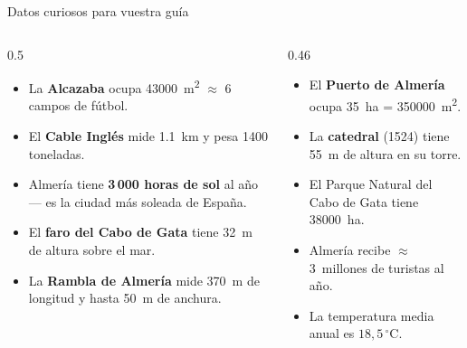 \documentclass[aspectratio=169, 10pt, spanish]{beamer}
\begin{document}
\begin{frame}{Datos curiosos para vuestra guía}
  \begin{columns}[T]
    \begin{column}{0.5\textwidth}
      \begin{notabox}
        \begin{itemize}
          \item La \textbf{Alcazaba} ocupa \SI{43000}{m^2}
                $\approx$ 6 campos de fútbol.
          \item El \textbf{Cable Inglés} mide \SI{1.1}{km}
                y pesa \num{1400} toneladas.
          \item Almería tiene \textbf{3\,000 horas de sol}
                al año — es la ciudad más soleada de España.
          \item El \textbf{faro del Cabo de Gata} tiene
                \SI{32}{m} de altura sobre el mar.
          \item La \textbf{Rambla de Almería} mide \SI{370}{m}
                de longitud y hasta \SI{50}{m} de anchura.
        \end{itemize}
      \end{notabox}
    \end{column}
    \begin{column}{0.46\textwidth}
      \begin{notabox}
        \begin{itemize}
          \item El \textbf{Puerto de Almería} ocupa
                \SI{35}{ha} = \SI{350000}{m^2}.
          \item La \textbf{catedral} (1524) tiene
                \SI{55}{m} de altura en su torre.
          \item El Parque Natural del Cabo de Gata
                tiene \SI{38000}{ha}.
          \item Almería recibe $\approx$\,\SI{3}{millones}
                de turistas al año.
          \item La temperatura media anual es \ensuremath{18{,}5\,^\circ\mathrm{C}}.
        \end{itemize}
      \end{notabox}
    \end{column}
  \end{columns}
\end{frame}

\end{document}
